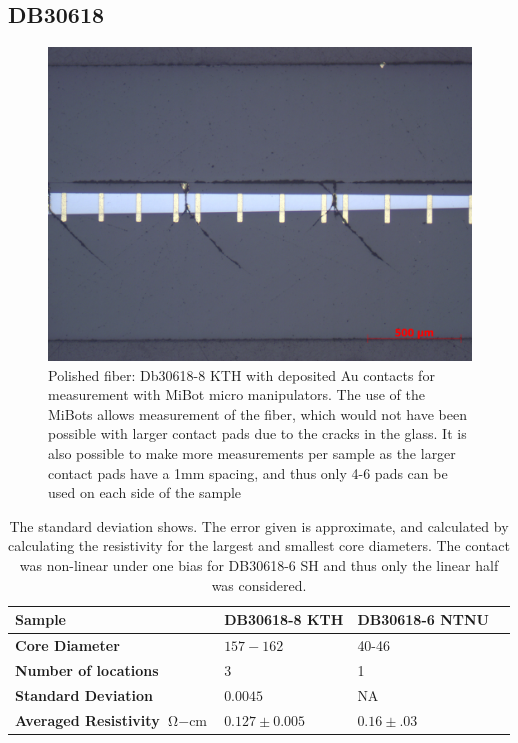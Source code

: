 \subsection{DB30618}


\begin{figure}
    \centering
    \includegraphics[width=\textwidth]{fig/Results/kthdb30618-8.jpg}
    \caption{Polished fiber: Db30618-8 KTH with deposited Au contacts for measurement with MiBot micro manipulators. The use of the MiBots allows measurement of the fiber, which would not have been possible with larger contact pads due to the cracks in the glass. It is also possible to make more measurements per sample as the larger contact pads have a 1mm spacing, and thus only 4-6 pads can be used on each side of the sample}
    \label{fig:db30618KTH}
\end{figure}


\begin{table}[!h]
\begin{center}
\begin{tabular}{ | l | l | l | l |}
\hline
\textbf{Sample}& DB30618-8 KTH & DB30618-6 NTNU \\ \hline
\textbf{Core Diameter}& $157-162$ & 40-46 \\\hline
\textbf{Number of locations}& 3&1 \\\hline
\textbf{Standard Deviation}& $0.0045$& NA \\\hline
\textbf{Averaged Resistivity $\si{\ohm-\cm}$}&$0.127 \pm 0.005$& $0.16 \pm .03$  \\\hline
\end{tabular}
\end{center}
\caption{The standard deviation shows. The error given is approximate, and calculated by calculating the resistivity for the largest and smallest core diameters. The contact was non-linear under one bias for DB30618-6 SH and thus only the linear half was considered. }
\label{Tabmb25}
\end{table}

